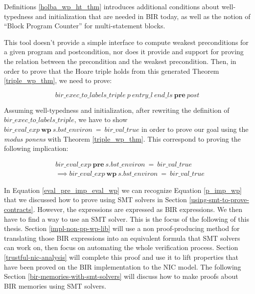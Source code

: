 \documentclass{kththesis}
\begin{document}
Definitions \ref{holba_wp_ht_thm} introduces additional conditions about well-typedness and initialization that are needed in BIR today\footnotemark, as well as the notion of ``Block Program Counter'' for multi-statement blocks. %


This tool doesn't provide a simple interface to compute weakest preconditions for a given program and postcondition, nor does it provide and support for proving the relation between the precondition and the weakest precondition. Then, in order to prove that the Hoare triple holds from this generated Theorem \ref{triple_wp_thm}, we need to prove:

\begin{equation} 
    bir\_exec\_to\_labels\_triple~p~entry\_l~end\_ls~\mathbf{pre}~post
    \label{triple_pre_thm}
\end{equation}

Assuming well-typedness and initialization, after rewriting the definition of $bir\_exec\_to\_labels\_triple$, we have to show $bir\_eval\_exp~\mathbf{wp}~s.bst\_environ~=~bir\_val\_true$ in order to prove our goal using the \textit{modus ponens} with Theorem \ref{triple_wp_thm}. This correspond to proving the following implication:

\begin{small}
    \begin{equation}
        \begin{split}
            &bir\_eval\_exp~\mathbf{pre}~s.bst\_environ~=~bir\_val\_true\\
            &\implies bir\_eval\_exp~\mathbf{wp}~s.bst\_environ~=~bir\_val\_true
        \end{split}
        \label{eval_pre_imp_eval_wp}
    \end{equation}
\end{small}

In Equation \ref{eval_pre_imp_eval_wp} we can recognize Equation \ref{p_imp_wp} that we discussed how to prove using \gls{SMT} solvers in Section \ref{using-smt-to-prove-contracts}. However, the expressions are expressed as BIR expressions. We then have to find a way to use an SMT solver. This is the focus of the following of this thesis. Section \ref{impl-non-pp-wp-lib} will use a non proof-producing method for translating those BIR expressions into an equivalent formula that SMT solvers can work on, then focus on automating the whole verification process. Section \ref{trustful-nic-analysis} will complete this proof and use it to lift properties that have been proved on the BIR implementation to the \gls{NIC} model. The following Section \ref{bir-memories-with-smt-solvers} will discuss how to make proofs about BIR memories using \gls{SMT} solvers.
\end{document}
